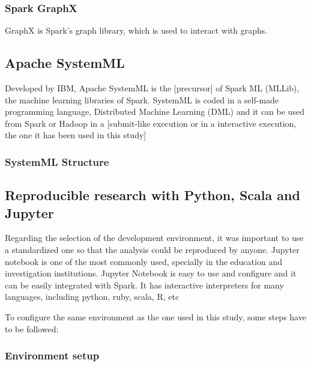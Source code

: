 \documentclass[11pt]{article} %
\begin{document}
      \subsubsection*{Spark GraphX}

        GraphX is Spark's graph library, which is used to interact with graphs.





  \subsection{Apache SystemML}

    Developed by IBM, Apache SystemML is the [precursor] of Spark ML (MLLib), the machine learning libraries of Spark.
    SystemML is coded in a self-made programming language, Distributed Machine Learning (DML) and it can be used from Spark or Hadoop in a [submit-like execution or in a interactive execution, the one it has been used in this study]

    \subsubsection{SystemML Structure}



  \subsection{Reproducible research with Python, Scala and Jupyter}

    Regarding the selection of the development environment, it was important to use a standardized one so that the analysis could be reproduced by anyone. Jupyter notebook is one of the most commonly used, specially in the education and investigation institutions. Jupyter Notebook is easy to use and configure and it can be easily integrated with Spark. It has interactive interpreters for many languages, including python, ruby, scala, R, etc

    To configure the same environment as the one used in this study, some steps have to be followed:

    \subsubsection{Environment setup}
\end{document}
